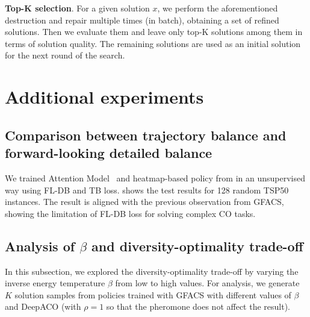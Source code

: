 \documentclass[twoside]{article}
\theoremstyle{plain}
\theoremstyle{definition}
\theoremstyle{remark}
\begin{document}
\textbf{Top-K selection}. For a given solution $x$, we perform the aforementioned destruction and repair multiple times (in batch), obtaining a set of refined solutions. Then we evaluate them and leave only top-K solutions among them in terms of solution quality. The remaining solutions are used as an initial solution for the next round of the search.



\section{Additional experiments} 


\subsection{Comparison between trajectory balance and forward-looking detailed balance}
\label{append:fl-db}

\begin{table}[ht]
    \centering
    \vspace{-5pt}
    \caption{Comparison between forward-looking detailed balance (FL-DB) and trajectory balance (TB) loss in TSP50, using Attention Model (AM) and heatmap-based method from \citet{joshi2021learning} as backbone policies.}
    \resizebox{0.5\linewidth}{!}{}
    \label{tab:vsLTFT}
    \vspace{0pt}
\end{table}

We trained Attention Model~\citep[AM;][]{kool2018attention} and heatmap-based policy from \citet{joshi2021learning} in an unsupervised way using FL-DB and TB loss.  shows the test results for 128 random TSP50 instances. The result is aligned with the previous observation from GFACS, showing the limitation of FL-DB loss for solving complex CO tasks.



\subsection{Analysis of $\beta$ and diversity-optimality trade-off} \label{sec:beta_tradeoff}

In this subsection, we explored the diversity-optimality trade-off by varying the inverse energy temperature $\beta$ from low to high values. For analysis, we generate $K$ solution samples from policies trained with GFACS with different values of $\beta$ and DeepACO (with $\rho=1$ so that the pheromone does not affect the result).
\end{document}
